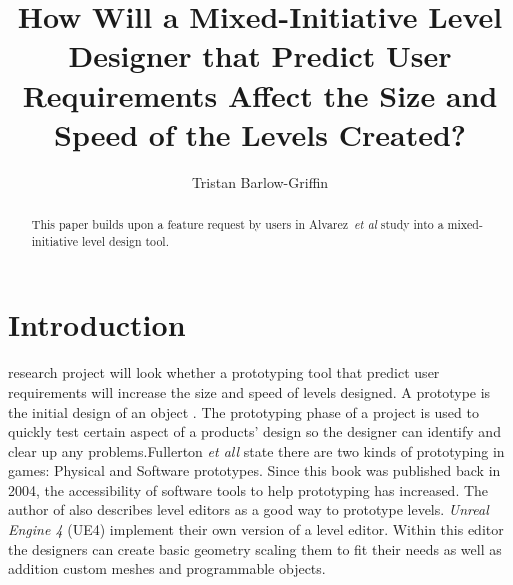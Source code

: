 \documentclass[journal]{IEEEtran}
\begin{document}
%
\title{ How Will a Mixed-Initiative Level Designer that Predict User Requirements Affect the Size and Speed of the Levels Created?}
%
%

\author{Tristan Barlow-Griffin}


\maketitle

\begin{abstract}
This paper builds upon a feature request by users in Alvarez~\textit{et al}\cite{alvarez2018fostering} study into a mixed-initiative level design tool. 
\end{abstract}





\section{Introduction} \label{intro}
 research project will look whether a prototyping tool that predict user requirements will increase the size and speed of levels designed. A prototype is the initial design of an object \cite{prototype}. The prototyping phase of a project is used to quickly test certain aspect of a products' design so the designer can identify and clear up any problems\cite{budde1992prototyping}.Fullerton \textit{et all} \cite[p.~150]{fullerton2004game} state there are two kinds of prototyping in games: Physical and Software prototypes. Since this book was published back in 2004, the accessibility of software tools to help prototyping has increased. The author of \cite[p.~164]{fullerton2004game} also describes level editors as a good way to prototype levels. \textit{Unreal Engine 4} (UE4) implement their own version of a level editor. Within this editor the designers can create basic geometry scaling them to fit their needs as well as addition custom meshes and programmable objects.
\end{document}
